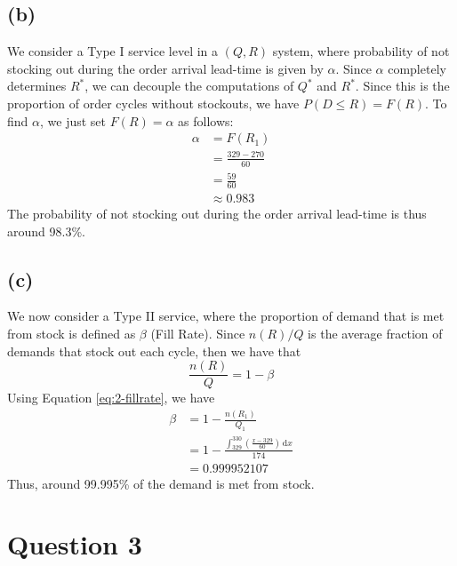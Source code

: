 \documentclass[12pt]{article}
\begin{document}
\subsection*{(b)}   


We consider a Type I service level in a $(Q,R)$ system, where probability of not stocking out during the order arrival lead-time is given by $\alpha$. Since $\alpha$ completely determines $R^{*}$, we can decouple the computations of $Q^{*}$ and $R^{*}$. Since this is the proportion of order cycles without stockouts, we have $P(D \leq R) = F(R)$. To find $\alpha$, we just set $F(R) = \alpha$ as follows: \begin{align*}
    \alpha &= F(R_{1}) \\ 
    &= \frac{329- 270}{60} \\ 
    &= \frac{59}{60} \\ 
    &\approx \boxed{0.983}
\end{align*} The probability of not stocking out during the order arrival lead-time is thus around 98.3\%.

\subsection*{(c)}   


We now consider a Type II service, where the proportion of demand that is met from stock is defined as $\beta$ (Fill Rate). Since $n(R) / Q$ is the average fraction of demands that stock out each cycle, then we have that \begin{equation}\label{eq:2-fillrate}
    \frac{n(R)}{Q} = 1-\beta
\end{equation} Using Equation \ref{eq:2-fillrate}, we have \begin{align*}
    \beta &= 1- \frac{n(R_{1})}{Q_{1}} \\ 
    &= 1- \displaystyle\frac{ \displaystyle \int_{329}^{330} \left( \frac{x-329}{60} \right) \, \mathrm{d}x}{174} \\ 
    &= 0.999952107  
\end{align*} Thus, around 99.995\%  of the demand is met from stock. 


\newpage

\section*{Question 3}
\end{document}
